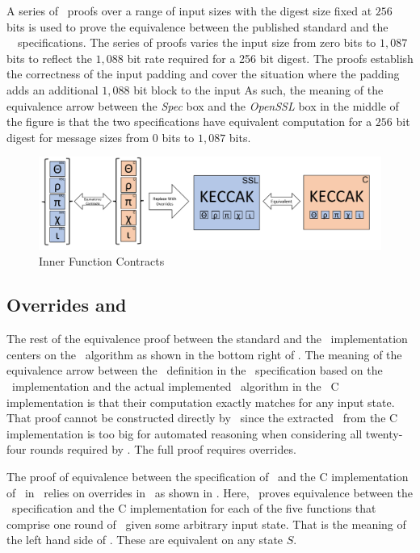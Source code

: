 A series of \saw\ proofs over a range of input sizes with the digest size fixed at $256$ bits is used to prove the equivalence between the published standard and the \openssl\ \cryptol\ specifications.
The series of proofs varies the input size from zero bits to $1,087$ bits to reflect the $1,088$ bit rate required for a 256 bit digest.
The proofs establish the correctness of the input padding and cover the situation where the padding adds an additional $1,088$ bit block to the input 
As such, the meaning of the equivalence arrow between the \emph{Spec} box and the \emph{OpenSSL} box in the middle of the figure is that the two specifications have equivalent computation for a $256$ bit digest for message sizes from $0$ bits to $1,087$ bits.

\begin{figure}[t]
  \centering
  \includegraphics[width=\linewidth]{figs/proof2.png}
  
  \caption{Inner Function Contracts}
  \label{fig:proofStructure2}
  
\end{figure}

\subsection{Overrides and \keccak}

The rest of the equivalence proof between the standard and the \openssl\ implementation centers on the \keccak\ algorithm as shown in the bottom right of .
The meaning of the equivalence arrow between the \keccak\ definition in the \cryptol\ specification based on the \openssl\ implementation and the actual implemented \keccak\ algorithm in the \openssl\ C implementation is that their computation exactly matches for any input state.
That proof cannot be constructed directly by \saw\ since the extracted \sawcore\ from the C implementation is too big for automated reasoning when considering all twenty-four rounds required by \keccak.
The full proof requires overrides.

The proof of equivalence between the specification of \keccak\ and the C implementation of \keccak\ in \openssl\ relies on overrides in \saw\ as shown in .
Here, \saw\ proves equivalence between the \cryptol\ specification and the C implementation for each of the five functions that comprise one round of \keccak\ given some arbitrary input state.
That is the meaning of the left hand side of .
These are equivalent on any state $S$.

